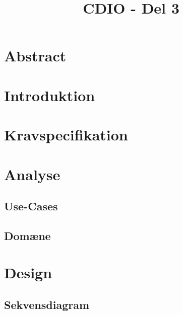 \documentclass[12pt,oneside,a4paper,english]{article}
\title{CDIO - Del 3} %
\begin{document}


\newpage
\doublespacing
\renewcommand{\baselinestretch}{1}\normalsize
\tableofcontents
\renewcommand{\baselinestretch}{1}\normalsize
\thispagestyle{fancy} %

\newpage
{} 
\label{EndOfText}

\newpage

\thispagestyle{fancy}

\newpage
\section{Abstract}

\thispagestyle{fancy}

\newpage
\section{Introduktion}

\thispagestyle{fancy}

\newpage
\section{Kravspecifikation}

\thispagestyle{fancy}

\newpage
\section{Analyse}

\thispagestyle{fancy}

\newpage 
\subsection{Use-Cases}


\newpage
\subsection{Domæne}


\newpage
\section{Design}

\thispagestyle{fancy}

\newpage
\subsection{Sekvensdiagram}
\end{document}
